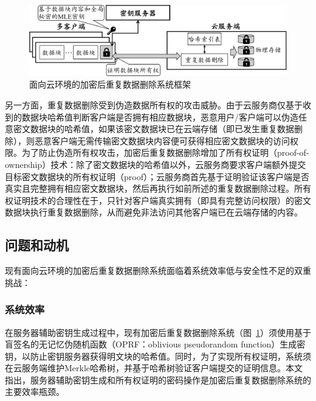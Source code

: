 \begin{figure}[!htb]
    \small
    \centering
    \includegraphics[width=\textwidth]{pic/Cloud-encrypted-deduplication-logic.pdf}
    \caption{面向云环境的加密后重复数据删除系统框架}
    \label{fig:Cloud-based-encrypted-deduplication-storage-logic}
\end{figure}

另一方面，重复数据删除受到伪造数据所有权的攻击威胁\cite{harnik10,mulazzani11}。由于云服务商仅基于收到的数据块哈希值判断客户端是否拥有相应数据块，恶意用户/客户端可以伪造任意密文数据块的哈希值，如果该密文数据块已在云端存储（即已发生重复数据删除），则恶意客户端无需传输密文数据块内容便可获得相应密文数据块的访问权限。为了防止伪造所有权攻击，加密后重复数据删除增加了所有权证明（proof-of-ownership）技术\cite{halevi11}：除了密文数据块的哈希值以外，云服务商要求客户端额外提交目标密文数据块的所有权证明（proof）；云服务商首先基于证明验证该客户端是否真实且完整拥有相应密文数据块，然后再执行如前所述的重复数据删除过程。所有权证明技术的合理性在于，只针对客户端真实拥有（即具有完整访问权限）的密文数据块执行重复数据删除，从而避免非法访问其他客户端已在云端存储的内容。

\subsection{问题和动机}
\label{subsec:intro-problem}

现有面向云环境的加密后重复数据删除系统面临着系统效率低与安全性不足的双重挑战：

\subsubsection{系统效率} 
\label{subsubsec:intro-problem-performance}

在服务器辅助密钥生成过程中，现有加密后重复数据删除系统（图~\ref{fig:Cloud-based-encrypted-deduplication-storage-logic}）须使用基于盲签名\cite{armknecht2015transparent,bellare2013DupLESS}的无记忆伪随机函数（OPRF：oblivious pseudorandom function）生成密钥\cite{bellare2013DupLESS}，以防止密钥服务器获得明文块的哈希值。同时，为了实现所有权证明，系统须在云服务端维护Merkle哈希树，并基于哈希树验证客户端提交的证明信息\cite{halevi2011proofs}。本文指出，服务器辅助密钥生成和所有权证明的密码操作是加密后重复数据删除系统的主要效率瓶颈。

